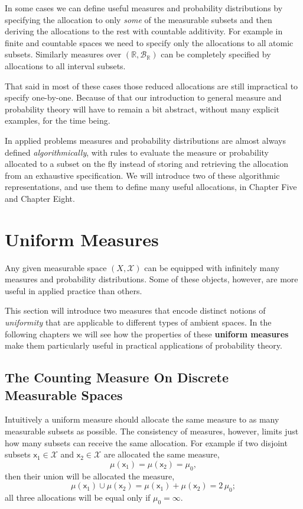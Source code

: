 \documentclass[
  letterpaper,
  DIV=11,
  numbers=noendperiod]{scrartcl}
\begin{document}
In some cases we can define useful measures and probability
distributions by specifying the allocation to only \emph{some} of the
measurable subsets and then deriving the allocations to the rest with
countable additivity. For example in finite and countable spaces we need
to specify only the allocations to all atomic subsets. Similarly
measures over \((\mathbb{R}, \mathcal{B}_{\mathbb{R}})\) can be
completely specified by allocations to all interval subsets.

That said in most of these cases those reduced allocations are still
impractical to specify one-by-one. Because of that our introduction to
general measure and probability theory will have to remain a bit
abstract, without many explicit examples, for the time being.

In applied problems measures and probability distributions are almost
always defined \emph{algorithmically}, with rules to evaluate the
measure or probability allocated to a subset on the fly instead of
storing and retrieving the allocation from an exhaustive specification.
We will introduce two of these algorithmic representations, and use them
to define many useful allocations, in Chapter Five and Chapter Eight.

\hypertarget{uniform-measures}{%
\section{Uniform Measures}\label{uniform-measures}}

Any given measurable space \((X, \mathcal{X})\) can be equipped with
infinitely many measures and probability distributions. Some of these
objects, however, are more useful in applied practice than others.

This section will introduce two measures that encode distinct notions of
\emph{uniformity} that are applicable to different types of ambient
spaces. In the following chapters we will see how the properties of
these \textbf{uniform measures} make them particularly useful in
practical applications of probability theory.

\hypertarget{the-counting-measure-on-discrete-measurable-spaces}{%
\subsection{The Counting Measure On Discrete Measurable
Spaces}\label{the-counting-measure-on-discrete-measurable-spaces}}

Intuitively a uniform measure should allocate the same measure to as
many measurable subsets as possible. The consistency of measures,
however, limits just how many subsets can receive the same allocation.
For example if two disjoint subsets \(\mathsf{x}_{1} \in \mathcal{X}\)
and \(\mathsf{x}_{2} \in \mathcal{X}\) are allocated the same measure,
\[
\mu(\mathsf{x}_{1}) = \mu(\mathsf{x}_{2}) = \mu_{0},
\] then their union will be allocated the measure, \[
\mu(\mathsf{x}_{1}) \cup \mu(\mathsf{x}_{2})
=
\mu(\mathsf{x}_{1}) + \mu(\mathsf{x}_{2})
=
2 \, \mu_{0};
\] all three allocations will be equal only if \(\mu_{0} = \infty\).
\end{document}
